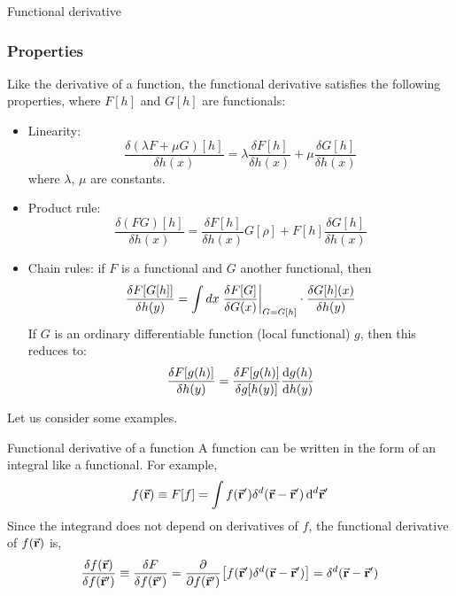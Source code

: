 \documentclass[../main/main.tex]{subfiles}
\begin{document}
\begin{definition}{Functional derivative}{}
\subsubsection{Properties}
Like the derivative of a function, the functional derivative satisfies the following properties, where \( F[h] \) and \( G[h] \) are functionals:
\begin{itemize}
\item Linearity:
\begin{equation*}
  {\frac  {\delta (\lambda F+\mu G)[h ]}{\delta h (x)}}=\lambda {\frac  {\delta F[h ]}{\delta h (x)}}+\mu {\frac  {\delta G[h ]}{\delta h(x)}}
\end{equation*}
where \( \lambda\), \(\mu  \) are constants.
\item Product rule:
\begin{equation*}
{\frac  {\delta (FG)[h ]}{\delta h(x)}}={\frac  {\delta F[h ]}{\delta h (x)}}G[\rho ]+F[h]{\frac  {\delta G[h ]}{\delta h (x)}}
\end{equation*}
\item Chain rules:
if \( F \)  is a functional and \( G \)  another functional, then
\begin{equation*}
  \frac{\delta F[G[h]] }{\delta h(y)}  = \int dx \eval{\frac{\delta F[G]}{\delta G(x)}}_{G = G[h]} \cdot\frac {\delta G[h](x)} {\delta h(y)}
\end{equation*}
If \( G \)  is an ordinary differentiable function (local functional) \( g \), then this reduces to:
\begin{equation*}
   {\frac {\delta F[g( h )]}{\delta h(y)}}={\frac {\delta F[g( h)]}{\delta g[h (y)]}} \dv{g(h )}{ h(y)}
\end{equation*}
\end{itemize}
\end{definition}

Let us consider some examples.

\begin{example}{Functional derivative of a function}{}
A function can be written in the form of an integral like a functional. For example,
\begin{equation*}
  f(\va{r}) \equiv F[ f ] = \int f ( \va{r}') \delta^d(\va{r}-\va{r}')\dd[d]{\va{r}'}
\end{equation*}
Since the integrand does not depend on derivatives of \( f \), the functional derivative of \(   f(\va{r})  \)  is,
\begin{equation*}
  \frac{\delta f (\va{r})}{\delta f (\va{r}')} \equiv \frac{\delta F}{\delta f (\va{r}')}
  =\pdv{}{f (\va{r}')}  \qty[ f ( \va{r}') \delta^d (\va{r}-\va{r}')] =  \delta^d (\va{r}-\va{r}')
\end{equation*}
\end{example}
\end{document}
